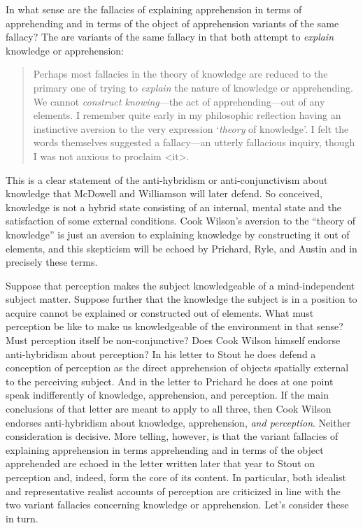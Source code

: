 \documentclass[11pt]{article}
\begin{document}
In what sense are the fallacies of explaining apprehension in terms of apprehending and in terms of the object of apprehension variants of the same fallacy? The are variants of the same fallacy in that both attempt to \emph{explain} knowledge or apprehension:
\begin{quote}
	Perhaps most fallacies in the theory of knowledge are reduced to the primary one of trying to \emph{explain} the nature of knowledge or apprehending. We cannot \emph{construct knowing}---the act of apprehending---out of any elements. I remember quite early in my philosophic reflection having an instinctive aversion to the very expression `\emph{theory} of knowledge'. I felt the words themselves suggested a fallacy---an utterly fallacious inquiry, though I was not anxious to proclaim <it>. \citep[]{Cook-Wilson:1926sf}
\end{quote}
This is a clear statement of the anti-hybridism or anti-conjunctivism about knowledge that McDowell and Williamson will later defend. So conceived, knowledge is not a hybrid state consisting of an internal, mental state and the satisfaction of some external conditions. Cook Wilson's aversion to the ``theory of knowledge'' is just an aversion to explaining knowledge by constructing it out of elements, and this skepticism will be echoed by Prichard, Ryle, and Austin and in precisely these terms.

Suppose that perception makes the subject knowledgeable of a mind-independent subject matter. Suppose further that the knowledge the subject is in a position to acquire cannot be explained or constructed out of elements. What must perception be like to make us knowledgeable of the environment in that sense? Must perception itself be non-conjunctive? Does Cook Wilson himself endorse anti-hybridism about perception? In his letter to Stout he does defend a conception of perception as the direct apprehension of objects spatially external to the perceiving subject. And in the letter to Prichard he does at one point speak indifferently of knowledge, apprehension, and perception. If the main conclusions of that letter are meant to apply to all three, then Cook Wilson endorses anti-hybridism about knowledge, apprehension, \emph{and perception}. Neither consideration is decisive. More telling, however, is that the variant fallacies of explaining apprehension in terms apprehending and in terms of the object apprehended are echoed in the letter written later that year to Stout on perception and, indeed, form the core of its content. In particular, both idealist and representative realist accounts of perception are criticized in line with the two variant fallacies concerning knowledge or apprehension. Let's consider these in turn.
\end{document}
